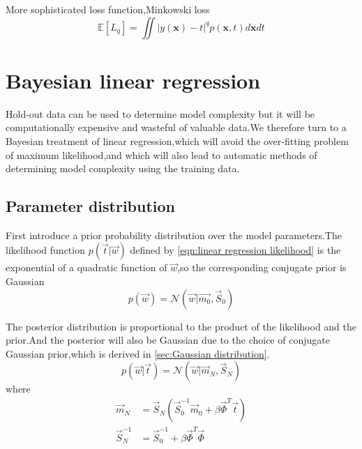More sophisticated loss function,Minkowski loss
\begin{equation}
\mathbb{E}[\mathit{L_q}] = \iint| y(\textbf{x}) - t |^q p(\textbf{x},t)d\textbf{x}dt
\end{equation}


\section{Bayesian linear regression}
Hold-out data can be used to determine model complexity but it will be 
computationally expensive and wasteful of valuable data.We therefore turn to a Bayesian treatment of linear regression,which will avoid the over-fitting problem of maximum likelihood,and which will also lead to automatic methods of determining model complexity using the training data.

\subsection{Parameter distribution}
First introduce a prior probability distribution over the model parameters.The likelihood function $p(\vec{t}|\vec{w})$ defined by \ref{eqn:linear regression likelihood} is the exponential of a quadratic function of $\vec{w}$,so the corresponding conjugate prior is
Gaussian
\begin{equation}
p(\vec{w}) = \mathcal{N}(\vec{w}|\vec{m_0},\vec{S}_0)
\end{equation}

The posterior distribution is proportional to the product of the likelihood and the prior.And the posterior will also be Gaussian due to the choice of conjugate Gaussian prior,which is derived in \ref{sec:Gaussian distribution}.
\begin{equation}
p(\vec{w}|\vec{t}) = \mathcal{N}(\vec{w}|\vec{m}_N,\vec{S}_N)
\end{equation}
where 
\begin{align}
\vec{m}_N &=\vec{S}_N(\vec{S}_0^{-1}\vec{m}_0+\beta\vec{\Phi}^T\vec{t})\\
\vec{S}_N^{-1} &= \vec{S}_0^{-1}+\beta\vec{\Phi}^T\vec{\Phi}
\end{align}




